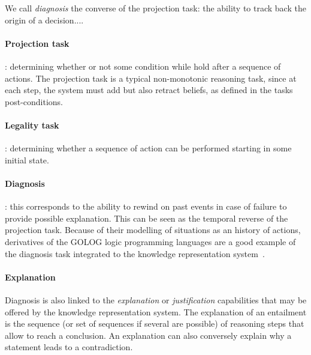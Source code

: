 We call \emph{diagnosis} the converse of the projection task: the ability to
track back the origin of a decision....

\begin{scriptsize}
\begin{center}
\end{center}
\end{scriptsize}


\paragraph{Projection task}: determining whether or not some condition while
hold after a sequence of actions. The projection task is a typical
non-monotonic reasoning task, since at each step, the system must add but also
retract beliefs, as defined in the tasks post-conditions.

\paragraph{Legality task}: determining whether a sequence of action can be
performed starting in some initial state.

\paragraph{Diagnosis}: this corresponds to the ability to rewind on past events
in case of failure to provide possible explanation. This can be seen as the
temporal reverse of the projection task. Because of their modelling of
situations as an history of actions, derivatives of the GOLOG logic programming
languages are a good example of the diagnosis task integrated to the knowledge
representation system~\cite{Gspandl2011}.

\paragraph{Explanation} Diagnosis is also linked to the \emph{explanation} or
\emph{justification} capabilities that may be offered by the knowledge
representation system. The explanation of an entailment is the sequence (or
set of sequences if several are possible) of reasoning steps that allow to
reach a conclusion. An explanation can also conversely explain why a statement leads to a
contradiction.

